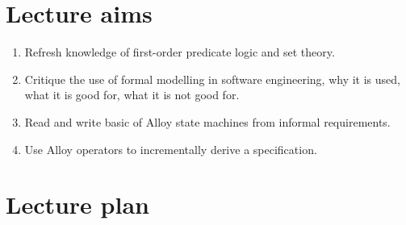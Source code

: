 \documentclass[11pt]{article}
\begin{document}
\section*{Lecture aims}

 \begin{enumerate}
  
  \item Refresh knowledge of first-order predicate logic and set theory.

  \item Critique the use of formal modelling in software engineering, why it is used, what it is good for, what it is not good for.

  \item Read and write basic of Alloy state machines from informal requirements.

  \item Use Alloy operators to incrementally derive a specification.

 \end{enumerate}

\section*{Lecture plan}
\end{document}
